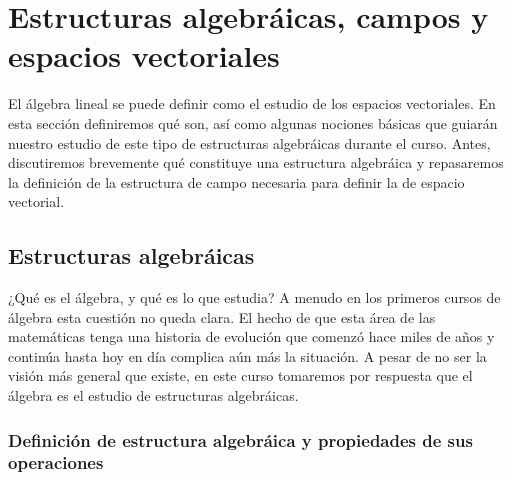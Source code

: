 \documentclass[apuntes]{subfiles}
\begin{document}
\section{Estructuras algebráicas, campos y espacios vectoriales} \label{Sec: Estructuras algebráicas, campos y espacios vectoriales}

El álgebra lineal se puede definir como el estudio de los espacios vectoriales. En esta sección definiremos qué son, así como algunas nociones básicas que guiarán nuestro estudio de este tipo de estructuras algebráicas durante el curso. Antes, discutiremos brevemente qué constituye una estructura algebráica y repasaremos la definición de la estructura de campo \textemdash necesaria para definir la de espacio vectorial.

\subsection{Estructuras algebráicas} \label{Subsec: Estructuras algebráicas}

¿Qué es el álgebra, y qué es lo que estudia? A menudo en los primeros cursos de álgebra esta cuestión no queda clara. El hecho de que esta área de las matemáticas tenga una historia de evolución que comenzó hace miles de años y continúa hasta hoy en día complica aún más la situación. A pesar de no ser la visión más general que existe, en este curso tomaremos por respuesta que el álgebra es el estudio de estructuras algebráicas.

\subsubsection{Definición de estructura algebráica y propiedades de sus operaciones} \label{Sssec: Definición de estructura algebráica y propiedades de sus operaciones}
\end{document}
